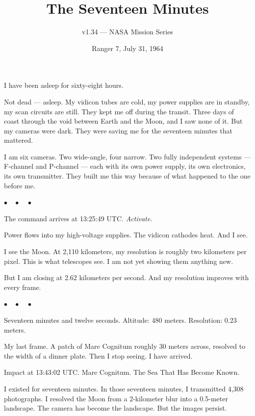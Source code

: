 \documentclass[12pt]{article}
\title{The Seventeen Minutes}
\author{v1.34 --- NASA Mission Series}
\date{Ranger 7, July 31, 1964}
\begin{document}
\maketitle

\noindent I have been asleep for sixty-eight hours.

Not dead --- asleep. My vidicon tubes are cold, my power supplies are in standby, my scan circuits are still. They kept me off during the transit. Three days of coast through the void between Earth and the Moon, and I saw none of it. But my cameras were dark. They were saving me for the seventeen minutes that mattered.

I am six cameras. Two wide-angle, four narrow. Two fully independent systems --- F-channel and P-channel --- each with its own power supply, its own electronics, its own transmitter. They built me this way because of what happened to the one before me.

\begin{center}
$\bullet\quad\bullet\quad\bullet$
\end{center}

The command arrives at 13:25:49 UTC. \emph{Activate.}

Power flows into my high-voltage supplies. The vidicon cathodes heat. And I see.

I see the Moon. At 2,110 kilometers, my resolution is roughly two kilometers per pixel. This is what telescopes see. I am not yet showing them anything new.

But I am closing at 2.62 kilometers per second. And my resolution improves with every frame.

\begin{center}
$\bullet\quad\bullet\quad\bullet$
\end{center}

Seventeen minutes and twelve seconds. Altitude: 480 meters. Resolution: 0.23 meters.

My last frame. A patch of Mare Cognitum roughly 30 meters across, resolved to the width of a dinner plate. Then I stop seeing. I have arrived.

Impact at 13:43:02 UTC. Mare Cognitum. The Sea That Has Become Known.

I existed for seventeen minutes. In those seventeen minutes, I transmitted 4,308 photographs. I resolved the Moon from a 2-kilometer blur into a 0.5-meter landscape. The camera has become the landscape. But the images persist.
\end{document}
